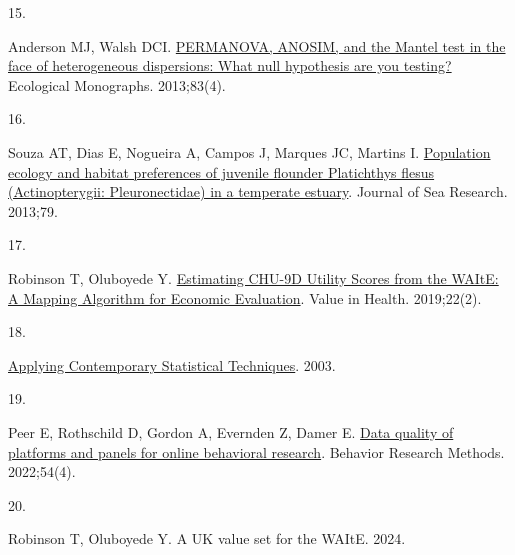 \documentclass[
  letterpaper,
  DIV=11,
  numbers=noendperiod]{scrartcl}
\newlength{\cslhangindent}
\newlength{\csllabelwidth}
\newenvironment{CSLReferences}[2] %
 {\begin{list}{}{%
  \setlength{\itemindent}{0pt}
  \setlength{\leftmargin}{0pt}
  \setlength{\parsep}{0pt}
  \ifodd #1
   \setlength{\leftmargin}{\cslhangindent}
   \setlength{\itemindent}{-1\cslhangindent}
  \fi
  \setlength{\itemsep}{#2\baselineskip}}}
 {\end{list}}
\newcommand{\CSLLeftMargin}[1]{\parbox[t]{\csllabelwidth}{\strut#1\strut}}
\newcommand{\CSLRightInline}[1]{\parbox[t]{\linewidth - \csllabelwidth}{\strut#1\strut}}
\begin{document}
\begin{CSLReferences}{0}{1}
\CSLLeftMargin{15. }%
\CSLRightInline{Anderson MJ, Walsh DCI.
\href{https://doi.org/10.1890/12-2010.1}{{PERMANOVA, ANOSIM, and the
Mantel test in the face of heterogeneous dispersions: What null
hypothesis are you testing?}} Ecological Monographs. 2013;83(4). }

\CSLLeftMargin{16. }%
\CSLRightInline{Souza AT, Dias E, Nogueira A, Campos J, Marques JC,
Martins I.
\href{https://doi.org/10.1016/j.seares.2013.01.005}{{Population ecology
and habitat preferences of juvenile flounder Platichthys flesus
(Actinopterygii: Pleuronectidae) in a temperate estuary}}. Journal of
Sea Research. 2013;79. }

\CSLLeftMargin{17. }%
\CSLRightInline{Robinson T, Oluboyede Y.
\href{https://doi.org/10.1016/j.jval.2018.09.2839}{{Estimating CHU-9D
Utility Scores from the WAItE: A Mapping Algorithm for Economic
Evaluation}}. Value in Health. 2019;22(2). }

\CSLLeftMargin{18. }%
\CSLRightInline{\href{https://doi.org/10.1016/b978-0-12-751541-0.x5021-4}{{Applying
Contemporary Statistical Techniques}}. 2003. }

\CSLLeftMargin{19. }%
\CSLRightInline{Peer E, Rothschild D, Gordon A, Evernden Z, Damer E.
\href{https://doi.org/10.3758/s13428-021-01694-3}{{Data quality of
platforms and panels for online behavioral research}}. Behavior Research
Methods. 2022;54(4). }

\CSLLeftMargin{20. }%
\CSLRightInline{Robinson T, Oluboyede Y. A UK value set for the WAItE.
2024. }

\end{CSLReferences}
\end{document}
